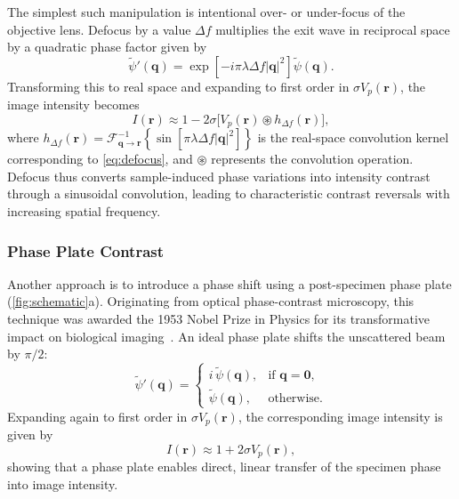 \documentclass[pdflatex,sn-aps,iicol]{sn-jnl}%
\begin{document}
The simplest such manipulation is intentional over- or under-focus of the objective lens.
Defocus by a value $\Delta f$ multiplies the exit wave in reciprocal space by a quadratic phase factor given by
\begin{equation}
  \tilde{\psi}'(\boldsymbol{q}) = \exp\!\left[-i \pi \lambda \Delta f \lvert \boldsymbol{q} \rvert^2 \right] \tilde{\psi}(\boldsymbol{q}).
  \label{eq:defocus}
\end{equation}
Transforming this to real space and expanding to first order in $\sigma V_p(\boldsymbol{r})$, the image intensity becomes
\begin{equation}
  I(\boldsymbol{r}) \approx 1 - 2\sigma \bigl[ V_p(\boldsymbol{r}) \circledast h_{\Delta f}(\boldsymbol{r}) \bigr],
  \label{eq:defocus-int}
\end{equation}
where $h_{\Delta f}(\boldsymbol{r}) = \mathcal{F}^{-1}_{\boldsymbol{q}\rightarrow\boldsymbol{r}} \!\left\{ \sin\!\left[\pi \lambda \Delta f \lvert \boldsymbol{q} \rvert^2 \right] \right\}$ is the real-space convolution kernel corresponding to \cref{eq:defocus}, and $\circledast$ represents the convolution operation.
Defocus thus converts sample-induced phase variations into intensity contrast through a sinusoidal convolution, leading to characteristic contrast reversals with increasing spatial frequency.

\subsubsection{Phase Plate Contrast}

Another approach is to introduce a phase shift using a post-specimen phase plate (\cref{fig:schematic}a).
Originating from optical phase-contrast microscopy, this technique was awarded the 1953 Nobel Prize in Physics for its transformative impact on biological imaging~\cite{Zernike_1942}.
An ideal phase plate shifts the unscattered beam by $\pi/2$:
\begin{equation}
  \tilde{\psi}'(\boldsymbol{q}) = \begin{cases} i\,\tilde{\psi}(\boldsymbol{q}), & \text{if } \boldsymbol{q}=\boldsymbol{0}, \\ \tilde{\psi}(\boldsymbol{q}), & \text{otherwise}. \end{cases}
  \label{eq:zernike}
\end{equation}
Expanding again to first order in $\sigma V_p(\boldsymbol{r})$, the corresponding image intensity is given by
\begin{equation}
  I(\boldsymbol{r}) \approx 1 + 2\sigma V_p(\boldsymbol{r}),
  \label{eq:zernike-int}
\end{equation}
showing that a phase plate enables direct, linear transfer of the specimen phase into image intensity.
\end{document}
